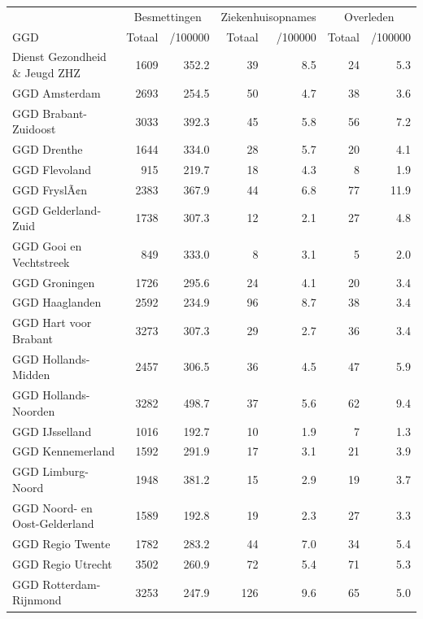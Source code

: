 \documentclass[
  english,
  man,floatsintext]{apa6}
\begin{document}
\begin{table}[H]
\centering\begingroup\fontsize{10}{12}\selectfont

\begin{threeparttable}
\begin{tabular}{lrrrrrr}
\toprule
\multicolumn{1}{c}{ } & \multicolumn{2}{c}{Besmettingen} & \multicolumn{2}{c}{Ziekenhuisopnames} & \multicolumn{2}{c}{Overleden} \\
\cmidrule(l{3pt}r{3pt}){2-3} \cmidrule(l{3pt}r{3pt}){4-5} \cmidrule(l{3pt}r{3pt}){6-7}
GGD & Totaal & /100000 & Totaal & /100000 & Totaal & /100000\\
\midrule
Dienst Gezondheid \& Jeugd ZHZ & 1609 & 352.2 & 39 & 8.5 & 24 & 5.3\\
GGD Amsterdam & 2693 & 254.5 & 50 & 4.7 & 38 & 3.6\\
GGD Brabant-Zuidoost & 3033 & 392.3 & 45 & 5.8 & 56 & 7.2\\
GGD Drenthe & 1644 & 334.0 & 28 & 5.7 & 20 & 4.1\\
GGD Flevoland & 915 & 219.7 & 18 & 4.3 & 8 & 1.9\\
GGD FryslÃ¢n & 2383 & 367.9 & 44 & 6.8 & 77 & 11.9\\
GGD Gelderland-Zuid & 1738 & 307.3 & 12 & 2.1 & 27 & 4.8\\
GGD Gooi en Vechtstreek & 849 & 333.0 & 8 & 3.1 & 5 & 2.0\\
GGD Groningen & 1726 & 295.6 & 24 & 4.1 & 20 & 3.4\\
GGD Haaglanden & 2592 & 234.9 & 96 & 8.7 & 38 & 3.4\\
GGD Hart voor Brabant & 3273 & 307.3 & 29 & 2.7 & 36 & 3.4\\
GGD Hollands-Midden & 2457 & 306.5 & 36 & 4.5 & 47 & 5.9\\
GGD Hollands-Noorden & 3282 & 498.7 & 37 & 5.6 & 62 & 9.4\\
GGD IJsselland & 1016 & 192.7 & 10 & 1.9 & 7 & 1.3\\
GGD Kennemerland & 1592 & 291.9 & 17 & 3.1 & 21 & 3.9\\
GGD Limburg-Noord & 1948 & 381.2 & 15 & 2.9 & 19 & 3.7\\
GGD Noord- en Oost-Gelderland & 1589 & 192.8 & 19 & 2.3 & 27 & 3.3\\
GGD Regio Twente & 1782 & 283.2 & 44 & 7.0 & 34 & 5.4\\
GGD Regio Utrecht & 3502 & 260.9 & 72 & 5.4 & 71 & 5.3\\
GGD Rotterdam-Rijnmond & 3253 & 247.9 & 126 & 9.6 & 65 & 5.0\\

\end{tabular}
\end{threeparttable}
\end{table}
\end{document}
